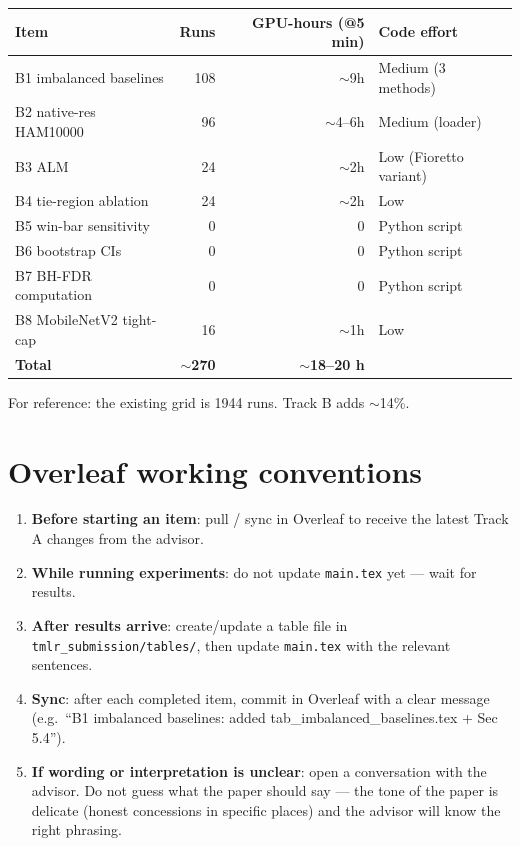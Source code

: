 \documentclass[11pt,a4paper]{article}
\newcommand{\code}[1]{\texttt{#1}}
\newcommand{\file}[1]{\texttt{#1}}
\begin{document}
\begin{table}[h]
\centering
\begin{tabular}{lrrl}
\toprule
Item & Runs & GPU-hours (@5 min) & Code effort \\
\midrule
B1 imbalanced baselines & 108 & $\sim$9h & Medium (3 methods) \\
B2 native-res HAM10000 & 96 & $\sim$4--6h & Medium (loader) \\
B3 ALM & 24 & $\sim$2h & Low (Fioretto variant) \\
B4 tie-region ablation & 24 & $\sim$2h & Low \\
B5 win-bar sensitivity & 0 & 0 & Python script \\
B6 bootstrap CIs & 0 & 0 & Python script \\
B7 BH-FDR computation & 0 & 0 & Python script \\
B8 MobileNetV2 tight-cap & 16 & $\sim$1h & Low \\
\midrule
\textbf{Total} & \textbf{$\sim$270} & \textbf{$\sim$18--20 h} & \\
\bottomrule
\end{tabular}
\end{table}

For reference: the existing grid is 1944 runs. Track B adds $\sim$14\%.

\section{Overleaf working conventions}

\begin{enumerate}[nosep]
  \item \textbf{Before starting an item}: pull / sync in Overleaf to
        receive the latest Track A changes from the advisor.
  \item \textbf{While running experiments}: do not update \code{main.tex}
        yet --- wait for results.
  \item \textbf{After results arrive}: create/update a table file in
        \file{tmlr\_submission/tables/}, then update \code{main.tex} with
        the relevant sentences.
  \item \textbf{Sync}: after each completed item, commit in Overleaf with
        a clear message (e.g.\ ``B1 imbalanced baselines: added
        tab\_imbalanced\_baselines.tex + Sec 5.4'').
  \item \textbf{If wording or interpretation is unclear}: open a
        conversation with the advisor. Do not guess what the paper should
        say --- the tone of the paper is delicate (honest concessions in
        specific places) and the advisor will know the right phrasing.
\end{enumerate}
\end{document}
